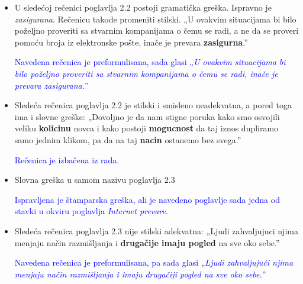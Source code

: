\documentclass[a4paper]{report}
\newcommand{\odgovor}[1]{\textcolor{blue}{#1}}
\begin{document}
\begin{itemize}
    \item U sledećoj rečenici poglavlja 2.2 postoji gramatička greška. Ispravno je \textit{zasigurana}. Rečenicu takođe promeniti stilski.\newline
    „U ovakvim situacijama bi bilo poželjno proveriti sa stvarnim kompanijama o čemu se radi, a ne da se proveri pomoću broja iz elektronske pošte, inače je prevara \textbf{zasigurna}.”
   
    \odgovor{Navedena rečenica je preformulisana, sada glasi „\textit{U ovakvim situacijama bi bilo poželjno proveriti sa stvarnim kompanijama o čemu se radi, inače je prevara zasigurana.}”}
    
\end{itemize}
\begin{itemize}
    \item Sledeća rečenica poglavlja 2.2 je stilski i smisleno neadekvatna, a pored toga ima i slovne greške: \newline
    „Dovoljno je da nam stigne poruka kako smo osvojili veliku \textbf{kolicinu} novca i kako postoji \textbf{mogucnost} da taj iznos dupliramo samo jednim klikom, pa da na taj \textbf{nacin} ostanemo bez svega.”
    
    \odgovor{Rečenica je izbačena iz rada.}
    
\end{itemize}
\begin{itemize}
    \item Slovna greška u samom nazivu poglavlja 2.3
    
    \odgovor{Ispravljena je štamparska greška, ali je navedeno poglavlje sada jedna od stavki u okviru poglavlja \textit{Internet prevare}.}
    
\end{itemize}
\begin{itemize}
    \item Sledeća rečenica poglavlja 2.3 nije stilski adekvatna: \newline
    „Ljudi zahvaljujuci njima menjaju način razmišljanja i \textbf{drugačije imaju pogled} na sve oko sebe.”
    
    \odgovor{Navedena rečenica je preformulisana, pa sada glasi „\textit{Ljudi zahvaljujući njima menjaju način razmišljanja i imaju drugačiji pogled na sve oko sebe.}”}
    
\end{itemize}
\end{document}
